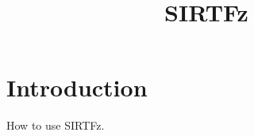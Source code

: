 \documentclass[11pt,preprint]{aastex}
\begin{document}
\title{SIRTFz}

\section{Introduction}

How to use SIRTFz.
\end{document}
